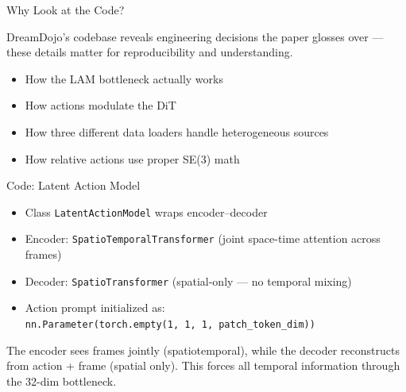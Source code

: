 \begin{frame}{Why Look at the Code?}
\begin{keybox}
DreamDojo's codebase reveals engineering decisions
the paper glosses over --- these details matter
for reproducibility and understanding.
\end{keybox}

\vspace{0.5em}
\begin{itemize}
    \item How the LAM bottleneck actually works
    \item How actions modulate the DiT
    \item How three different data loaders
          handle heterogeneous sources
    \item How relative actions use proper SE(3) math
\end{itemize}
\end{frame}

\begin{frame}{Code: Latent Action Model}
\begin{methodbox}
\begin{itemize}
    \item Class \texttt{LatentActionModel} wraps
           encoder--decoder
    \item Encoder: \texttt{SpatioTemporalTransformer}
          (joint space-time attention across frames)
    \item Decoder: \texttt{SpatioTransformer}
          (spatial-only --- no temporal mixing)
    \item Action prompt initialized as:\\
          {\small \texttt{nn.Parameter(torch.empty(1, 1, 1, patch\_token\_dim))}}
\end{itemize}
\end{methodbox}

\vspace{0.3em}
 The encoder sees  frames
jointly (spatiotemporal), while the decoder reconstructs
from action +  frame (spatial only).
This forces all temporal information through the
32-dim bottleneck.
\end{frame}

